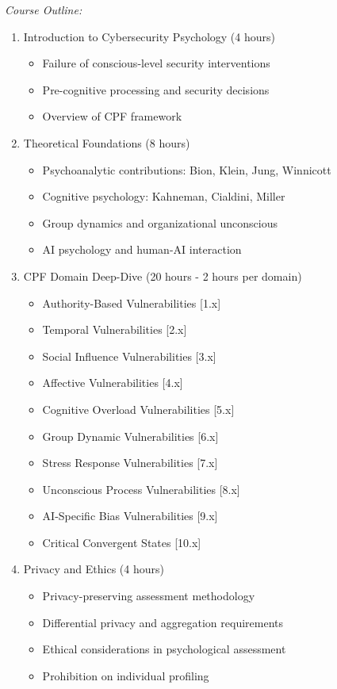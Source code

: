 \documentclass[11pt,a4paper]{article}
\begin{document}
\textit{Course Outline:}
\begin{enumerate}
\item Introduction to Cybersecurity Psychology (4 hours)
\begin{itemize}
\item Failure of conscious-level security interventions
\item Pre-cognitive processing and security decisions
\item Overview of CPF framework
\end{itemize}

\item Theoretical Foundations (8 hours)
\begin{itemize}
\item Psychoanalytic contributions: Bion, Klein, Jung, Winnicott
\item Cognitive psychology: Kahneman, Cialdini, Miller
\item Group dynamics and organizational unconscious
\item AI psychology and human-AI interaction
\end{itemize}

\item CPF Domain Deep-Dive (20 hours - 2 hours per domain)
\begin{itemize}
\item Authority-Based Vulnerabilities [1.x]
\item Temporal Vulnerabilities [2.x]
\item Social Influence Vulnerabilities [3.x]
\item Affective Vulnerabilities [4.x]
\item Cognitive Overload Vulnerabilities [5.x]
\item Group Dynamic Vulnerabilities [6.x]
\item Stress Response Vulnerabilities [7.x]
\item Unconscious Process Vulnerabilities [8.x]
\item AI-Specific Bias Vulnerabilities [9.x]
\item Critical Convergent States [10.x]
\end{itemize}

\item Privacy and Ethics (4 hours)
\begin{itemize}
\item Privacy-preserving assessment methodology
\item Differential privacy and aggregation requirements
\item Ethical considerations in psychological assessment
\item Prohibition on individual profiling
\end{itemize}


\end{enumerate}
\end{document}
